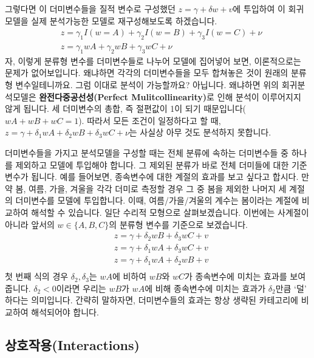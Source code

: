 \documentclass[
]{book}
\begin{document}
그렇다면 이 더미변수들을 질적 변수로 구성했던 \(z = \gamma + \delta w + v\)에 투입하여 이 회귀모델을 실제 분석가능한 모델로 재구성해보도록 하겠습니다.
\begin{equation*}
\begin{aligned}
&z = \gamma_1 I(w = A) + \gamma_2 I(w = B) + \gamma_3 I(w = C) + \nu\\
&z = \gamma_1 wA + \gamma_2 wB + \gamma_3 wC + \nu
\end{aligned}
\end{equation*}
자, 이렇게 분류형 변수를 더미변수들로 나누어 모델에 집어넣어 보면, 이론적으로는 문제가 없어보입니다. 왜냐하면 각각의 더미변수들을 모두 합쳐놓은 것이 원래의 분류형 변수일테니까요. 그럼 이대로 분석이 가능할까요? 아닙니다. 왜냐하면 위의 회귀분석모델은 \textbf{완전다중공선성(Perfect Mulitcollinearity)}로 인해 분석이 이루어지지 않게 됩니다. 세 더미변수의 총합, 즉 절편값이 1이 되기 때문입니다(\(wA+wB+wC = 1\)). 따라서 모든 조건이 일정하다고 할 때, \(z = \gamma + \delta_1 wA + \delta_2 wB + \delta_3 wC + \nu\)는 사실상 아무 것도 분석하지 못합니다.

더미변수들을 가지고 분석모델을 구성할 때는 전체 분류에 속하는 더미변수들 중 하나를 제외하고 모델에 투입해야 합니다. 그 제외된 분류가 바로 전체 더미들에 대한 기준변수가 됩니다. 예를 들어보면, 종속변수에 대한 계절의 효과를 보고 싶다고 합시다. 만약 봄, 여름, 가을, 겨울을 각각 더미로 측정할 경우 그 중 봄을 제외한 나머지 세 계절의 더미변수를 모델에 투입합니다. 이때, 여름/가을/겨울의 계수는 봄이라는 계절에 비교하여 해석할 수 있습니다. 일단 수리적 모형으로 살펴보겠습니다. 이번에는 사계절이 아니라 앞서의 \(w \in \{A,B,C\}\)의 분류형 변수를 기준으로 보겠습니다.
\begin{equation*}
\begin{aligned}
&z = \gamma + \delta_2 wB + \delta_3 wC + v\\
&z = \gamma + \delta_1 wA + \delta_3 wC + v\\
&z = \gamma + \delta_1 wA + \delta_2 wB + v\\
\end{aligned}
\end{equation*}
첫 번째 식의 경우 \(\delta_2, \delta_3\)는 \(wA\)에 비하여 \(wB\)와 \(wC\)가 종속변수에 미치는 효과를 보여줍니다. \(\delta_2 < 0\)이라면 우리는 \(wB\)가 \(wA\)에 비해 종속변수에 미치는 효과가 \(\delta_2\)만큼 `덜' 하다는 의미입니다. 간략히 말하자면, 더미변수들의 효과는 항상 생략된 카테고리에 비교하여 해석되어야 합니다.

\hypertarget{uxc0c1uxd638uxc791uxc6a9interactions}{%
\subsection{상호작용(Interactions)}\label{uxc0c1uxd638uxc791uxc6a9interactions}}
\end{document}
